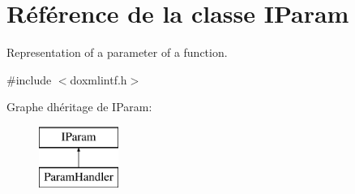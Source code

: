 \hypertarget{class_i_param}{}\section{Référence de la classe I\+Param}
\label{class_i_param}


Representation of a parameter of a function.  




{\ttfamily \#include $<$doxmlintf.\+h$>$}

Graphe d\textquotesingle{}héritage de I\+Param\+:\begin{figure}[H]
\begin{center}
\leavevmode
\includegraphics[height=2.000000cm]{class_i_param}
\end{center}
\end{figure}
